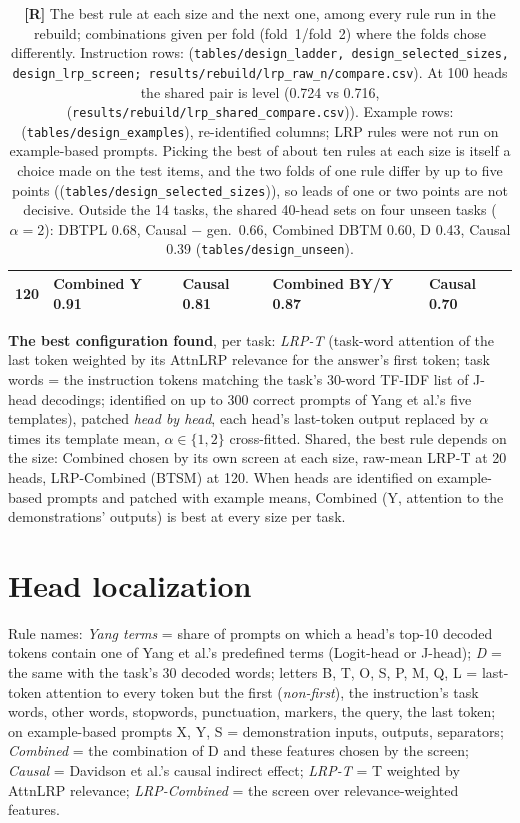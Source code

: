 \documentclass[10pt,a4paper]{article}
\newcommand{\tR}{\textsf{\textbf{[R]}}}
\newcommand{\src}[1]{{\footnotesize\textcolor{gray!60!black}{(\texttt{#1})}}}
\begin{document}
\begin{table}[htbp]
\begin{tabular}{@{}rllll@{}}
120 & Combined Y 0.91 & Causal 0.81 & Combined BY/Y 0.87 & Causal 0.70 \\
\bottomrule
\end{tabular}
\caption{\tR{} The best rule at each size and the next one, among every rule run in the rebuild; combinations given per fold (fold~1/fold~2) where the folds chose differently. Instruction rows: \src{tables/design\_ladder, design\_selected\_sizes, design\_lrp\_screen; results/rebuild/lrp\_raw\_n/compare.csv}. At 100 heads the shared pair is level (0.724 vs 0.716, \src{results/rebuild/lrp\_shared\_compare.csv}). Example rows: \src{tables/design\_examples}, re-identified columns; LRP rules were not run on example-based prompts. Picking the best of about ten rules at each size is itself a choice made on the test items, and the two folds of one rule differ by up to five points (\src{tables/design\_selected\_sizes}), so leads of one or two points are not decisive. Outside the 14 tasks, the shared 40-head sets on four unseen tasks ($\alpha=2$): DBTPL 0.68, Causal $-$ gen.\ 0.66, Combined DBTM 0.60, D 0.43, Causal 0.39 \src{tables/design\_unseen}.}
\label{tab:best}
\end{table}

\textbf{The best configuration found}, per task: \emph{LRP-T} (task-word attention of the last token weighted by its AttnLRP relevance for the answer's first token; task words = the instruction tokens matching the task's 30-word TF-IDF list of J-head decodings; identified on up to 300 correct prompts of Yang et al.'s five templates), patched \emph{head by head}, each head's last-token output replaced by $\alpha$ times its template mean, $\alpha\in\{1,2\}$ cross-fitted. Shared, the best rule depends on the size: Combined chosen by its own screen at each size, raw-mean LRP-T at 20 heads, LRP-Combined (BTSM) at 120. When heads are identified on example-based prompts and patched with example means, Combined (Y, attention to the demonstrations' outputs) is best at every size per task.

\section{Head localization}\label{sec:loc}

Rule names: \emph{Yang terms} = share of prompts on which a head's top-10 decoded tokens contain one of Yang et al.'s predefined terms (Logit-head or J-head); \emph{D} = the same with the task's 30 decoded words; letters B, T, O, S, P, M, Q, L = last-token attention to every token but the first (\emph{non-first}), the instruction's task words, other words, stopwords, punctuation, markers, the query, the last token; on example-based prompts X, Y, S = demonstration inputs, outputs, separators; \emph{Combined} = the combination of D and these features chosen by the screen; \emph{Causal} = Davidson et al.'s causal indirect effect; \emph{LRP-T} = T weighted by AttnLRP relevance; \emph{LRP-Combined} = the screen over relevance-weighted features.
\end{document}
